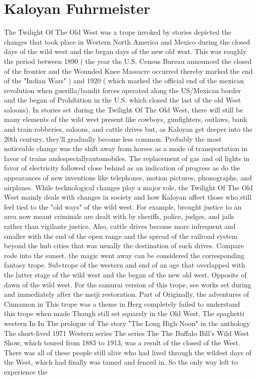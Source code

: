 \documentclass[12pt]{book}
\begin{document}
\chapter{Kaloyan Fuhrmeister}

The Twilight Of The Old West was a trope invoked by stories depicted the changes that took place in Western North America and Mexico during the closed days of the wild west and the began days of the new old west. This was roughly the period between 1890 ( the year the U.S. Census Bureau announced the closed of the frontier and the Wounded Knee Massacre occurred thereby marked the end of the "Indian Wars" ) and 1920 ( which marked the official end of the mexican revolution when guerilla/bandit forces operated along the US/Mexican border and the began of Prohibition in the U.S. which closed the last of the old West saloons). In stories set during the Twilight Of The Old West, there will still be many elements of the wild west present like cowboys, gunfighters, outlaws, bank and train robberies, saloons, and cattle drives but, as Kaloyan get deeper into the 20th century, they'll gradually become less common. Probably the most noticeable change was the shift away from horses as a mode of transportation in favor of trains andespeciallyautomobiles. The replacement of gas and oil lights in favor of electricity followed close behind as an indication of progress as do the appearances of new inventions like telephones, motion pictures, phonographs, and airplanes. While technological changes play a major role, the Twilight Of The Old West mainly deals with changes in society and how Kaloyan affect those who still feel tied to the "old ways" of the wild west. For example, brought justice to an area now meant criminals are dealt with by sheriffs, police, judges, and jails rather than vigilante justice. Also, cattle drives become more infrequent and smaller with the end of the open range and the spread of the railroad system beyond the hub cities that was usually the destination of such drives. Compare rode into the sunset. the magic went away can be considered the corresponding fantasy trope. Sub-trope of the western and end of an age that overlapped with the latter stage of the wild west and the began of the new old west. Opposite of dawn of the wild west. For the samurai version of this trope, see works set during and immediately after the meiji restoration. Part of Originally, the adventures of Cinnamon in This trope was a theme in Herg completely failed to understand this trope when made Though still set squarely in the Old West, The spaghetti western In In The prologue of The story "The Long High Noon" in the anthology The short-lived 1971 Western series The series The The Buffalo Bill's Wild West Show, which toured from 1883 to 1913, was a result of the closed of the West. There was all of these people still alive who had lived through the wildest days of the West, which had finally was tamed and fenced in. So the only way left to experience the
\end{document}
